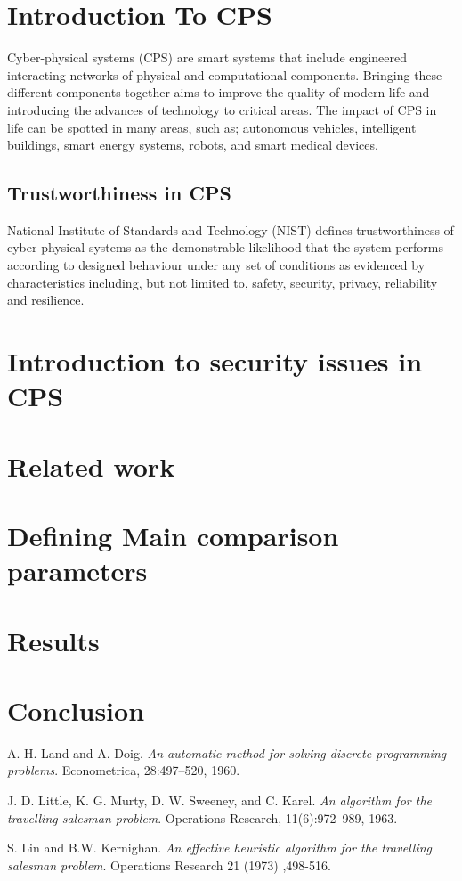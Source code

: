 \section{Introduction To CPS}
Cyber-physical systems (CPS) are smart systems that include engineered interacting networks of physical and computational components. Bringing these different components together aims to improve the quality of modern life and introducing the advances of technology to critical areas. The impact of CPS in life can be spotted in many areas, such as; autonomous vehicles, intelligent buildings, smart energy systems, robots, and smart medical devices. 

\subsection{Trustworthiness in CPS}
National Institute of Standards and Technology (NIST) defines trustworthiness of cyber-physical systems as the demonstrable likelihood that the system performs according to designed behaviour under any set of conditions as evidenced by characteristics including, but not limited to, safety, security, privacy, reliability and resilience.

\section{Introduction to security issues in CPS}

\section{Related work}
 
\section{Defining Main comparison parameters}

\section{Results}

\section{Conclusion} 
 
 

\begin{thebibliography}{9}

 
A. H. Land and A. Doig. 
\textit{An automatic method for solving discrete programming problems}. 
Econometrica, 28:497–520, 1960.
 
 J. D. Little, K. G. Murty, D. W. Sweeney, and C. Karel.
\textit{An algorithm for the travelling salesman problem}. 
Operations Research, 11(6):972–989, 1963.

 S. Lin and B.W.  Kernighan.
\textit{An effective heuristic algorithm for the travelling salesman problem}.
Operations Research 21 (1973) ,498-516.

\end{thebibliography}
\citep{Doe:2009:Misc}
\cite{Doe:2009:Misc}


